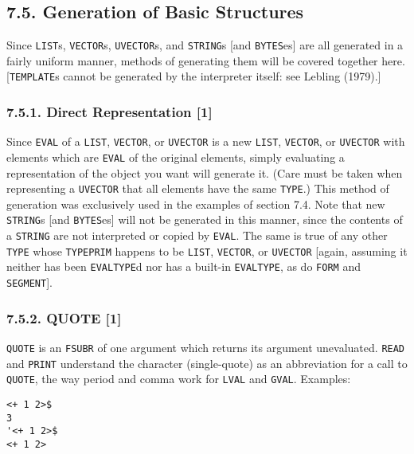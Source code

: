\documentclass[a4paper,]{article}
\begin{document}
\subsection{7.5. Generation of Basic Structures}\label{generation-of-basic-structures}

Since \texttt{LIST}s, \texttt{VECTOR}s, \texttt{UVECTOR}s, and \texttt{STRING}s {[}and \texttt{BYTES}es{]} are all
generated in a fairly uniform manner, methods of generating them will be covered together here. {[}\texttt{TEMPLATE}s
cannot be generated by the interpreter itself: see Lebling (1979).{]}

\subsubsection{7.5.1. Direct Representation {[}1{]}}\label{direct-representation-1}

Since \texttt{EVAL} of a \texttt{LIST}, \texttt{VECTOR}, or \texttt{UVECTOR} is a new \texttt{LIST}, \texttt{VECTOR}, or
\texttt{UVECTOR} with elements which are \texttt{EVAL} of the original elements, simply evaluating a representation of the
object you want will generate it. (Care must be taken when representing a \texttt{UVECTOR} that all elements have the same
\texttt{TYPE}.) This method of generation was exclusively used in the examples of section 7.4. Note that new
\texttt{STRING}s {[}and \texttt{BYTES}es{]} will not be generated in this manner, since the contents of a \texttt{STRING}
are not interpreted or copied by \texttt{EVAL}. The same is true of any other \texttt{TYPE} whose \texttt{TYPEPRIM} happens
to be \texttt{LIST}, \texttt{VECTOR}, or \texttt{UVECTOR} {[}again, assuming it neither has been \texttt{EVALTYPE}d nor has
a built-in \texttt{EVALTYPE}, as do \texttt{FORM} and \texttt{SEGMENT}{]}.

\subsubsection{7.5.2. QUOTE {[}1{]}}\label{quote-1}

\texttt{QUOTE} is an \texttt{FSUBR} of one argument which returns its
argument unevaluated. \texttt{READ} and \texttt{PRINT} understand the character \texttt{\textquotesingle{}}
 (single-quote) as an abbreviation for a call to \texttt{QUOTE}, the way period and comma work for
\texttt{LVAL} and \texttt{GVAL}. Examples:

\begin{verbatim}
<+ 1 2>$
3
'<+ 1 2>$
<+ 1 2>
\end{verbatim}
\end{document}
